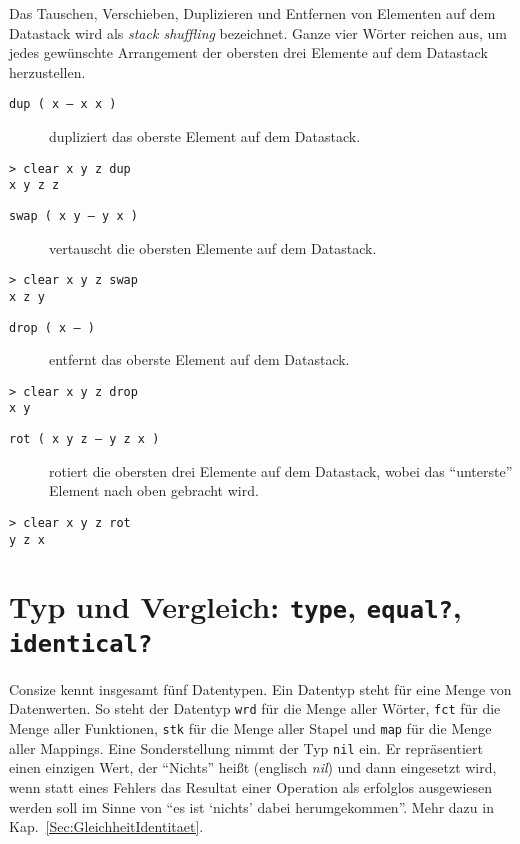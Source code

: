 Das Tauschen, Verschieben, Duplizieren und Entfernen von Elementen auf dem Datastack wird als \emph{stack shuffling} bezeichnet. Ganze vier Wörter reichen aus, um jedes gewünschte Arrangement der obersten drei Elemente auf dem Datastack herzustellen.

\begin{description}
\item[\texttt{dup ( x -- x x )}] dupliziert das oberste Element auf dem Datastack.
\end{description}

\begin{verbatim}
> clear x y z dup
x y z z
\end{verbatim}

\begin{description}
\item[\texttt{swap ( x y -- y x )}] vertauscht die obersten Elemente auf dem Datastack.
\end{description}

\begin{verbatim}
> clear x y z swap
x z y
\end{verbatim}

\begin{description}
\item[\texttt{drop ( x -- )}] entfernt das oberste Element auf dem Datastack.
\end{description}

\begin{verbatim}
> clear x y z drop
x y
\end{verbatim}

\begin{description}
\item[\texttt{rot ( x y z -- y z x )}] rotiert die obersten drei Elemente auf dem Datastack, wobei das "`unterste"' Element nach oben gebracht wird.
\end{description}

\begin{verbatim}
> clear x y z rot
y z x
\end{verbatim}

\section{Typ und Vergleich: \texttt{type}, \texttt{equal?}, \texttt{identical?}}

Consize kennt insgesamt fünf Datentypen. Ein Datentyp steht für eine Menge von Datenwerten. So steht der Datentyp \verb|wrd| für die Menge aller Wörter, \verb|fct| für die Menge aller Funktionen, \verb|stk| für die Menge aller Stapel und \verb|map| für die Menge aller Mappings. Eine Sonderstellung nimmt der Typ \verb|nil| ein. Er repräsentiert einen einzigen Wert, der "`Nichts"' heißt (englisch \emph{nil}) und dann eingesetzt wird, wenn statt eines Fehlers das Resultat einer Operation als erfolglos ausgewiesen werden soll im Sinne von "`es ist `nichts' dabei herumgekommen"'. Mehr dazu in Kap.~\ref{Sec:GleichheitIdentitaet}.

